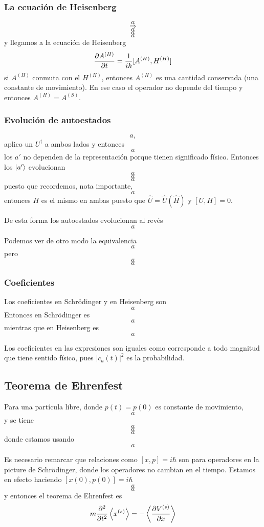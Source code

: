 \documentclass[10pt,oneside]{CBFT_book}
\begin{document}
\subsubsection{La ecuación de Heisenberg}

\[
	a
\]
\[
	\Rightarrow 
\]
\[
	a
\]
\[
	a
\]
\[
	a
\]
y llegamos a la ecuación de Heisenberg
\[
	\dpar{A^{(H)}}{t} = \frac{1}{i\hbar} [ A^{(H)}, H^{(H)}]
\]
si $A^{(H)}$ conmuta con el $H^{(H)}$, entonces $A^{(H)}$ es una cantidad conservada (una constante de movimiento).
En ese caso el operador no depende del tiempo y entonces $A^{(H)} = A^{(S)}$.

\subsubsection{Evolución de autoestados}

\[
	a,
\]
aplico un $U^\dagger$ a ambos lados y entonces 
\[
	a
\]
los $a'$ no dependen de la representación porque tienen significado físico. Entonces los $\Ket{a'}$ evolucionan
\[
	a
\]
\[
	a
\]
\[
	a
\]
puesto que recordemos, nota importante,
\[
	a
\]
entonces $H$ es el mismo en ambas puesto que $\hat{U} =\hat{U}(\hat{H}) $ y $[U,H]=0$.

De esta forma los autoestados evolucionan al revés 
\[
	a
\]

Podemos ver de otro modo la equivalencia
\[
	a
\]
pero 
\[
	a
\]
\[
	a
\]

\subsubsection{Coeficientes}

Los coeficientes en Schrödinger y en Heisenberg son 
\[
	a
\]
Entonces en Schrödinger es 
\[
	a
\]
mientras que en Heisenberg es 
\[
	a
\]

Los coeficientes en las expresiones son iguales como corresponde a todo magnitud que tiene sentido físico, pues 
$|c_a(t)|^2$ es la probabilidad.

\subsection{Teorema de Ehrenfest}

Para una partícula libre, donde $p(t)=p(0)$ es constante de movimiento,
\[
	a
\]
y se tiene 
\[
	a
\]
\[
	a
\]
\[
	a
\]
donde estamos usando 
\[
	a
\]

Es necesario remarcar que relaciones como $[x,p]=i\hbar$ son para operadores en la picture de Schrödinger, donde los 
operadores no cambian en el tiempo. Estamos en efecto haciendo $[x(0),p(0)]=i\hbar$
\[
	a
\]
\[
	a
\]
y entonces el teorema de Ehrenfest es 
\[
	m \dpar[2]{}{t} \Braket{x^{(s)}} = - \Braket{ \dpar{V^{(s)}}{x}}
\]
\end{document}
